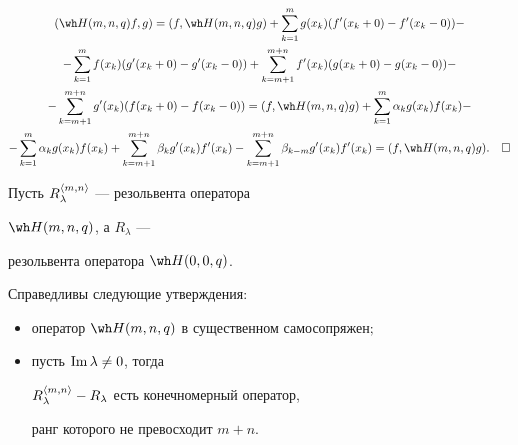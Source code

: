 \begin{multline*} 


(\wh H(m,n,q)f,g)=(f,\wh H(m,n,q)g)+\sum^m_{k=1}g(x_k) 


(f'(x_k+0)-f'(x_k-0))- \\


-\sum^m_{k=1}f(x_k)(g'(x_k+0)-g'(x_k-0))+


\sum^{m+n}_{k=m+1}f'(x_k)(g(x_k+0)-g(x_k-0))- \\


-\sum^{m+n}_{k=m+1}g'(x_k)(f(x_k+0)-f(x_k-0)) =


(f,\wh H(m,n,q)g)+\sum^m_{k=1}\alpha_k g(x_k)f(x_k)- \\


-\sum^m_{k=1}\alpha_k g(x_k)f(x_k) +


\sum^{m+n}_{k=m+1}\beta_k g'(x_k)f'(x_k)- 


\sum^{m+n}_{k=m+1}\beta_{k-m}g'(x_k)f'(x_k)= 


(f,\wh H(m,n,q)g). \quad\square 


\end{multline*} 


 


Пусть $R^{\langle m,n\rangle}_\lambda$ --- резольвента оператора 


$\wh H(m,n,q)$, а $R_\lambda$ --- 


резольвента оператора $\wh H(0,0,q)$. 


 


\begin{thm} 


Справедливы следующие утверждения$:$ 


\begin{itemize} 


\item[$1.$] оператор $\wh H(m,n,q)$ в существенном самосопряжен$;$ 


\item[$2.$] пусть $\operatorname{Im}\lambda\ne 0$, тогда 


$R^{\langle m,n\rangle}_\lambda-R_\lambda$ есть конечномерный оператор, 


ранг которого не превосходит $m+n$. 


\end{itemize} 


\end{thm} 


 


